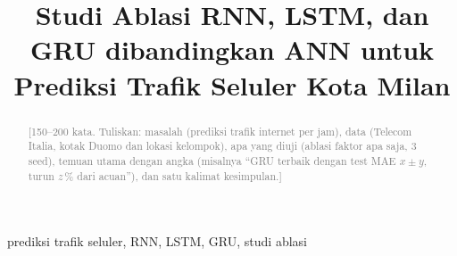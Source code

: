 \documentclass[conference,a4paper]{IEEEtran}
\newcommand{\petunjuk}[1]{\textcolor{gray}{[#1]}}
\begin{document}
\title{Studi Ablasi RNN, LSTM, dan GRU dibandingkan ANN untuk Prediksi Trafik Seluler Kota Milan}

\author{
\and
{}
\and
{}
}

\maketitle

\begin{abstract}
\petunjuk{150--200 kata. Tuliskan: masalah (prediksi trafik internet per jam), data (Telecom Italia, kotak Duomo dan lokasi kelompok), apa yang diuji (ablasi faktor apa saja, 3 seed), temuan utama dengan angka (misalnya ``GRU terbaik dengan test MAE $x \pm y$, turun $z$\,\% dari acuan''), dan satu kalimat kesimpulan.}
\end{abstract}

\begin{IEEEkeywords}
prediksi trafik seluler, RNN, LSTM, GRU, studi ablasi
\end{IEEEkeywords}

\end{document}

